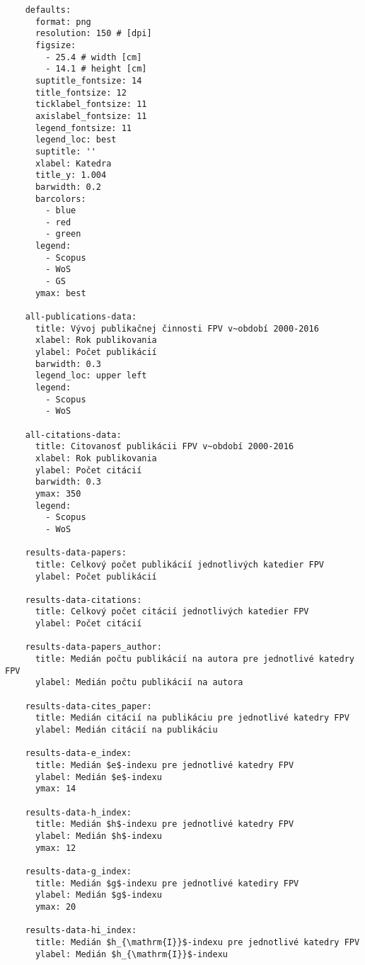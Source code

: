 \begin{source}
  \begin{verbatim}
    defaults:
      format: png
      resolution: 150 # [dpi]
      figsize:
        - 25.4 # width [cm]
        - 14.1 # height [cm]
      suptitle_fontsize: 14
      title_fontsize: 12
      ticklabel_fontsize: 11
      axislabel_fontsize: 11
      legend_fontsize: 11
      legend_loc: best
      suptitle: ''
      xlabel: Katedra
      title_y: 1.004
      barwidth: 0.2
      barcolors:
        - blue
        - red
        - green
      legend:
        - Scopus
        - WoS
        - GS
      ymax: best

    all-publications-data:
      title: Vývoj publikačnej činnosti FPV v~období 2000-2016
      xlabel: Rok publikovania
      ylabel: Počet publikácií
      barwidth: 0.3
      legend_loc: upper left
      legend:
        - Scopus
        - WoS

    all-citations-data:
      title: Citovanosť publikácii FPV v~období 2000-2016
      xlabel: Rok publikovania
      ylabel: Počet citácií
      barwidth: 0.3
      ymax: 350
      legend:
        - Scopus
        - WoS

    results-data-papers:
      title: Celkový počet publikácií jednotlivých katedier FPV
      ylabel: Počet publikácií

    results-data-citations:
      title: Celkový počet citácií jednotlivých katedier FPV
      ylabel: Počet citácií

    results-data-papers_author:
      title: Medián počtu publikácií na autora pre jednotlivé katedry FPV
      ylabel: Medián počtu publikácií na autora

    results-data-cites_paper:
      title: Medián citácií na publikáciu pre jednotlivé katedry FPV
      ylabel: Medián citácií na publikáciu

    results-data-e_index:
      title: Medián $e$-indexu pre jednotlivé katedry FPV
      ylabel: Medián $e$-indexu
      ymax: 14

    results-data-h_index:
      title: Medián $h$-indexu pre jednotlivé katedry FPV
      ylabel: Medián $h$-indexu
      ymax: 12

    results-data-g_index:
      title: Medián $g$-indexu pre jednotlivé katediry FPV
      ylabel: Medián $g$-indexu
      ymax: 20

    results-data-hi_index:
      title: Medián $h_{\mathrm{I}}$-indexu pre jednotlivé katedry FPV
      ylabel: Medián $h_{\mathrm{I}}$-indexu


\end{verbatim}
\end{source}
